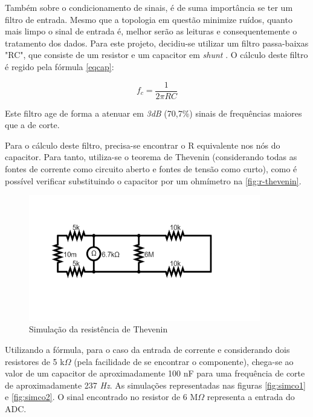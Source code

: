 Também sobre o condicionamento de sinais, é de suma importância se ter um filtro de entrada. Mesmo que a topologia em questão minimize ruídos, quanto mais limpo o sinal de entrada é, melhor serão as leituras e consequentemente o tratamento dos dados. Para este projeto, decidiu-se utilizar um filtro passa-baixas "RC", que consiste de um resistor e um capacitor em \textit{shunt} \cite{filtros}. O cálculo deste filtro é regido pela fórmula \autoref{eqcap}:

\begin{equation}
    \label{eqcap}
    f_{c} = \frac{1}{2\pi RC}
\end{equation}

Este filtro age de forma a atenuar em \textit{3dB} (70,7\%) sinais de frequências maiores que a de corte.

Para o cálculo deste filtro, precisa-se encontrar o R equivalente nos nós do capacitor. Para tanto, utiliza-se o teorema de Thevenin (considerando todas as fontes de corrente como circuito aberto e fontes de tensão como curto), como é possível verificar substituindo o capacitor por um ohmímetro na \autoref{fig:r-thevenin}.

\begin{figure}[htb!]
    \caption{Simulação da resistência de Thevenin}
    \label{fig:r-thevenin}
    \includegraphics[width=0.9\textwidth]{figuras/r-thevenin.png}
    \fonte{}
\end{figure}

Utilizando a fórmula, para o caso da entrada de corrente e considerando dois resistores de 5 k$\Omega$ (pela facilidade de se encontrar o componente), chega-se ao valor de um capacitor de aproximadamente 100 nF para uma frequência de corte de aproximadamente 237 \textit{Hz}. As simulações representadas nas figuras \ref{fig:simco1} e \ref{fig:simco2}. O sinal encontrado no resistor de 6 M$\Omega$ representa a entrada do \gls{ADC}.

